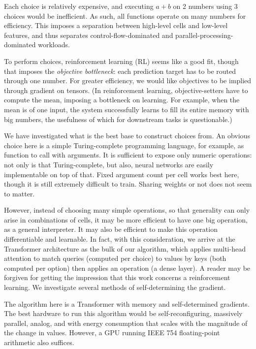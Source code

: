 \documentclass{article}
\begin{document}
Each choice is relatively expensive, and executing $a+b$ on 2 numbers using 3 choices would be inefficient. As such, all functions operate on many numbers for efficiency. This imposes a separation between high-level cells and low-level features, and thus separates control-flow-dominated and parallel-processing-dominated workloads.

To perform choices, reinforcement learning (RL) seems like a good fit, though that imposes the \textit{objective bottleneck}: each prediction target has to be routed through one number. For greater efficiency, we would like objectives to be implied through gradient on tensors. (In reinforcement learning, objective-setters have to compute the mean, imposing a bottleneck on learning. For example, when the mean is of one input, the system successfully learns to fill its entire memory with big numbers, the usefulness of which for downstream tasks is questionable.)

We have investigated what is the best base to construct choices from. An obvious choice here is a simple Turing-complete programming language, for example, as function to call with arguments. It is sufficient to expose only numeric operations: not only is that Turing-complete, but also, neural networks are easily implementable on top of that. Fixed argument count per cell works best here, though it is still extremely difficult to train. Sharing weights or not does not seem to matter.

However, instead of choosing many simple operations, so that generality can only arise in combinations of cells, it may be more efficient to have one big operation, as a general interpreter. It may also be efficient to make this operation differentiable and learnable. In fact, with this consideration, we arrive at the Transformer architecture \cite{vaswani2017attention} as the bulk of our algorithm, which applies multi-head attention to match queries (computed per choice) to values by keys (both computed per option) then applies an operation (a dense layer). A reader may be forgiven for getting the impression that this work concerns a reinforcement learning. We investigate several methods of self-determining the gradient.

The algorithm here is a Transformer with memory and self-determined gradients. The best hardware to run this algorithm would be self-reconfiguring, massively parallel, analog, and with energy consumption that scales with the magnitude of the change in values. However, a GPU running IEEE 754 floating-point arithmetic also suffices.
\end{document}
